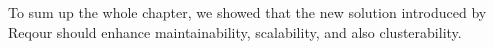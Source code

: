 \documentclass[../main.tex]{subfiles}
\begin{document}
To sum up the whole chapter, we showed that the new solution introduced by Reqour should enhance maintainability, scalability, and also clusterability.
\end{document}
